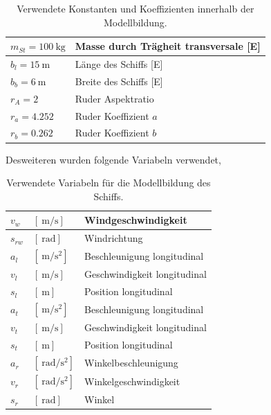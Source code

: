 \documentclass[]{iat}
\begin{document}
\begin{table}[H]
\begin{tabular}{l|l}
        $m_{St} = \SI{100}{\kg}$         & Masse durch Trägheit transversale [E]                                              \\ \hline
        $b_l = \SI{15}{\m}$              & Länge des Schiffs [E]                                                              \\ \hline
        $b_b = \SI{6}{\m}$               & Breite des Schiffs [E]                                                             \\ \hline
        $r_A  = 2$                       & Ruder Aspektratio \cite[]{Kulczyk_Tabaczek_2014_2}                                 \\ \hline
        $r_a = 4.252$                    & Ruder Koeffizient $a$ \cite[]{Kulczyk_Tabaczek_2014_2}                             \\ \hline
        $r_b = 0.262$                    & Ruder Koeffizient $b$ \cite[]{Kulczyk_Tabaczek_2014_2}
    \end{tabular}
    \caption{Verwendete Konstanten und Koeffizienten innerhalb der Modellbildung.}
    \label{tab:constants}
\end{table}

Desweiteren wurden folgende Variabeln verwendet,
\begin{table}[H]
    \begin{tabular}{ll|l}
        $v_w$    & $[\SI{}{\m\per\s}]$              & Windgeschwindigkeit          \\ \hline
        $s_{rw}$ & $[\SI{}{\radian}]$               & Windrichtung                 \\ \hline
        $a_l$    & $[\SI{}{\m\per\s\squared}]$      & Beschleunigung longitudinal  \\ \hline
        $v_l$    & $[\SI{}{\m\per\s}]$              & Geschwindigkeit longitudinal \\ \hline
        $s_l$    & $[\SI{}{\m}]$                    & Position longitudinal        \\ \hline
        $a_t$    & $[\SI{}{\m\per\s\squared}]$      & Beschleunigung longitudinal  \\ \hline
        $v_t$    & $[\SI{}{\m\per\s}]$              & Geschwindigkeit longitudinal \\ \hline
        $s_t$    & $[\SI{}{\m}]$                    & Position longitudinal        \\ \hline
        $a_r$    & $[\SI{}{\radian\per\s\squared}]$ & Winkelbeschleunigung         \\ \hline
        $v_r$    & $[\SI{}{\radian\per\s\squared}]$ & Winkelgeschwindigkeit        \\ \hline
        $s_r$    & $[\SI{}{\radian}]$               & Winkel
    \end{tabular}
    \caption{Verwendete Variabeln für die Modellbildung des Schiffs.}
    \label{tab:variables}
\end{table}
\end{document}
